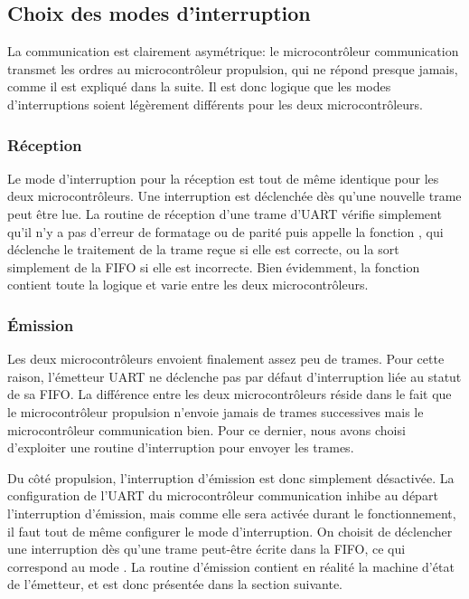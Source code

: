 \subsection{Choix des modes d'interruption}
La communication est clairement asymétrique: le microcontrôleur communication transmet les ordres au microcontrôleur propulsion, qui ne répond presque jamais, comme il est expliqué dans la suite. Il est donc logique que les modes d'interruptions soient légèrement différents pour les deux microcontrôleurs.

\subsubsection{Réception}
Le mode d'interruption pour la réception est tout de même identique pour les deux microcontrôleurs. Une interruption est déclenchée dès qu'une nouvelle trame peut être lue. La routine de réception d'une trame d'UART vérifie simplement qu'il n'y a pas d'erreur de formatage ou de parité puis appelle la fonction , qui déclenche le traitement de la trame reçue si elle est correcte, ou la sort simplement de la FIFO si elle est incorrecte. Bien évidemment, la fonction  contient toute la logique et varie entre les deux microcontrôleurs.

\subsubsection{\'Emission}
Les deux microcontrôleurs envoient finalement assez peu de trames. Pour cette raison, l'émetteur UART ne déclenche pas par défaut d'interruption liée au statut de sa FIFO. La différence entre les deux microcontrôleurs réside dans le fait que le microcontrôleur propulsion n'envoie jamais de trames successives mais le microcontrôleur communication bien. Pour ce dernier, nous avons choisi d'exploiter une routine d'interruption pour envoyer les trames.

Du côté propulsion, l'interruption d'émission est donc simplement désactivée. La configuration de l'UART du microcontrôleur communication inhibe au départ l'interruption d'émission, mais comme elle sera activée durant le fonctionnement, il faut tout de même configurer le mode d'interruption. On choisit de déclencher une interruption dès qu'une trame peut-être écrite dans la FIFO, ce qui correspond au mode . La routine d'émission contient en réalité la machine d'état de l'émetteur, et est donc présentée dans la section suivante.

